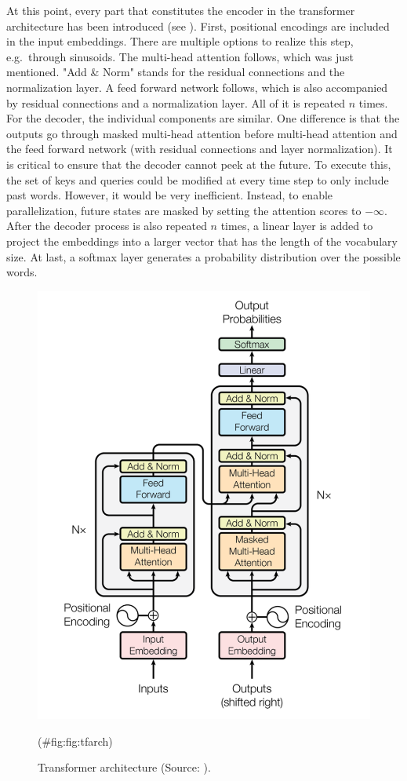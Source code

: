 \documentclass[
]{krantz}
\begin{document}
At this point, every part that constitutes the encoder in the
transformer architecture has been introduced (see ). First, positional
encodings are included in the input embeddings. There are multiple
options to realize this step, e.g.~through sinusoids. The multi-head
attention follows, which was just mentioned. "Add \& Norm" stands for
the residual connections and the normalization layer. A feed forward
network follows, which is also accompanied by residual connections and a
normalization layer. All of it is repeated \(n\) times. For the decoder,
the individual components are similar. One difference is that the
outputs go through masked multi-head attention before multi-head
attention and the feed forward network (with residual connections and
layer normalization). It is critical to ensure that the decoder cannot
peek at the future. To execute this, the set of keys and queries could
be modified at every time step to only include past words. However, it
would be very inefficient. Instead, to enable parallelization, future
states are masked by setting the attention scores to \(-\infty\). After
the decoder process is also repeated \(n\) times, a linear layer is added
to project the embeddings into a larger vector that has the length of
the vocabulary size. At last, a softmax layer generates a probability
distribution over the possible words.

\begin{figure}

{\centering \includegraphics[width=0.55\linewidth]{./figures/01-01-nlp/transformer_arch_vaswani} 

}

\caption{Transformer architecture (Source: \citet{vaswani2017attention}).}(\#fig:fig:tfarch)
\end{figure}
\end{document}
